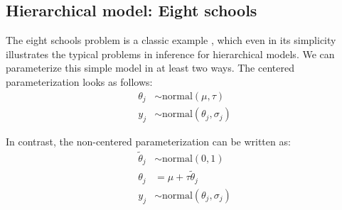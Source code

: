 \documentclass[american,]{article}
\begin{document}



\hypertarget{eightschools}{%
\subsection{Hierarchical model: Eight schools}\label{eightschools}}

The eight schools problem is a classic example
\citep[see Section 5.5 in][]{BDA3}, which even in its
simplicity illustrates the typical problems in inference for
hierarchical models. We can parameterize this simple model
in at least two ways. The centered parameterization looks as follows:
\begin{align*}
\theta_j &\sim \text{normal}(\mu, \tau) \\
y_j &\sim \text{normal}(\theta_j, \sigma_j)
\end{align*}

In contrast, the non-centered parameterization can be written as:
\begin{align*}
\tilde{\theta}_j &\sim \text{normal}(0, 1) \\
\theta_j &= \mu + \tau \tilde{\theta}_j \\
y_j &\sim \text{normal}(\theta_j, \sigma_j)
\end{align*}
\end{document}
